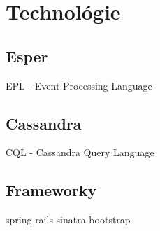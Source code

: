 \chapter{Technológie}
\section{Esper}
		EPL - Event Processing Language
\section{Cassandra}
		CQL - Cassandra Query Language
\section{Frameworky}
	 	spring
		rails
		sinatra
		bootstrap